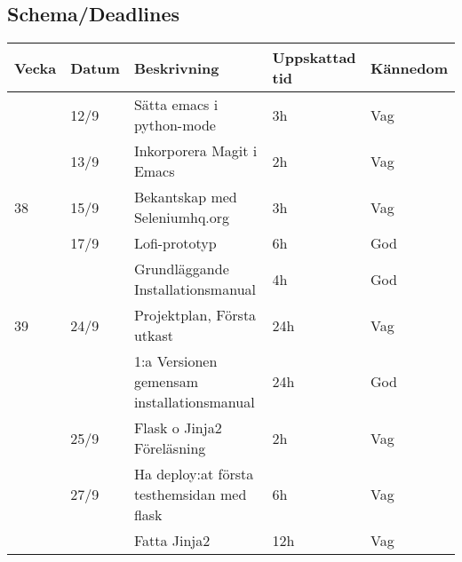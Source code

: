 \documentclass{TDP003mall}
\begin{document}
\subsection{Schema/Deadlines}

\begin{tabularx}{\linewidth}{|l|l|X|l|l|}
	\hline
	Vecka & Datum & Beskrivning                                         & Uppskattad tid & Kännedom    \\ [0.5ex]
	\hline                                                              
          & 12/9  & Sätta emacs i python-mode                           & 3h             & Vag         \\
	\hline                                                              
          & 13/9  & Inkorporera Magit i Emacs                           & 2h             & Vag         \\
	\hline                                                              
	38    & 15/9  & Bekantskap med Seleniumhq.org                       & 3h             & Vag         \\
	\hline                                                              
          & 17/9  & Lofi-prototyp                                       & 6h             & God         \\
	\hline                                                              
          &       & Grundläggande Installationsmanual                   & 4h             & God         \\
	\hline                                                              
	39    & 24/9  & Projektplan, Första utkast                          & 24h            & Vag         \\
	\hline                                                              
          &       & 1:a Versionen gemensam installationsmanual          & 24h            & God         \\
	\hline                                                              
          & 25/9  & Flask o Jinja2 Föreläsning                          & 2h             & Vag         \\
	\hline                                                              
          & 27/9  & Ha deploy:at första testhemsidan med flask          & 6h             & Vag         \\
	\hline                                                              
          &       & Fatta Jinja2                                        & 12h            & Vag         \\

\end{tabularx}
\end{document}
